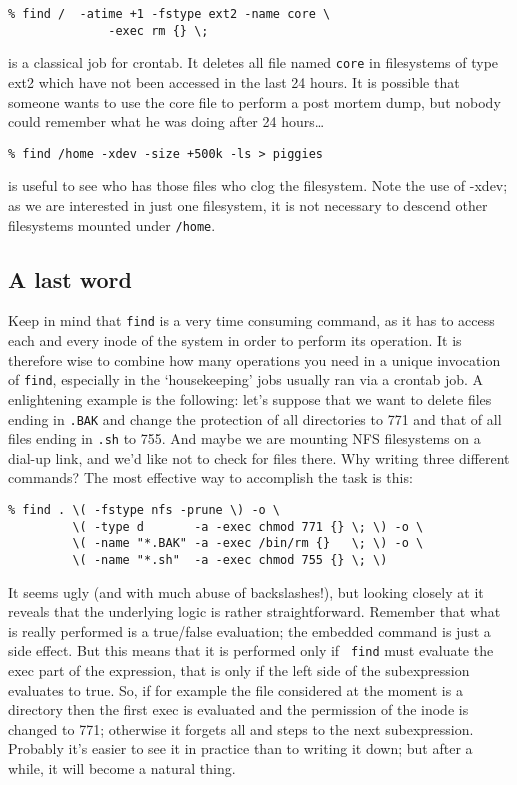 \begin{verbatim}
% find /  -atime +1 -fstype ext2 -name core \
              -exec rm {} \;
\end{verbatim}
is a classical job for crontab. It deletes all file named {\tt core} in
filesystems of type ext2 which have not been accessed in the last 24
hours. It is possible that someone wants to use the core file to perform a
post mortem dump, but nobody could remember what he was doing after 24
hours\ldots

\begin{verbatim}
% find /home -xdev -size +500k -ls > piggies
\end{verbatim}
is useful to see who has those files who clog the filesystem. Note the use
of -xdev; as we are interested in just one filesystem, it is not necessary
to descend other filesystems mounted under {\tt /home}.

\subsection{A last word}

Keep in mind that {\tt find} is a very time consuming command, as it has
to access each and every inode of the system in order to perform its
operation. It is therefore wise to combine how many operations you need in
a unique invocation of {\tt find}, especially in the `housekeeping' jobs
usually ran via a crontab job. A enlightening example is the following:
let's suppose that we want to delete files ending in {\tt .BAK} and change
the protection of all directories to 771 and that of all files ending in
{\tt .sh} to 755. And maybe we are mounting NFS filesystems on a dial-up link,
and we'd like not to check for files there. Why writing three different
commands? The most effective way to accomplish the task is this:

\begin{verbatim}
% find . \( -fstype nfs -prune \) -o \
         \( -type d       -a -exec chmod 771 {} \; \) -o \
         \( -name "*.BAK" -a -exec /bin/rm {}   \; \) -o \
         \( -name "*.sh"  -a -exec chmod 755 {} \; \) 
\end{verbatim}

It seems ugly (and with much abuse of backslashes!), but looking closely at
it reveals that the underlying logic is rather straightforward. Remember that
what is really performed is a true/false evaluation; the embedded command
is just a side effect. But this means that it is performed only if {\tt
find} must evaluate the exec part of the expression, that is only if the
left side of the subexpression evaluates to true. So, if for example the
file considered at the moment is a directory then the first exec is
evaluated and the permission of the inode is changed to 771; otherwise it
forgets all and steps to the next subexpression. Probably it's easier to
see it in practice than to writing it down; but after a while, it will
become a natural thing.

